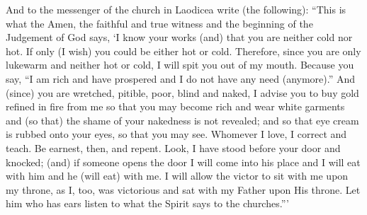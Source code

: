 \begin{pages}
\begin{Leftside}
		\pend
		\pstart
		And to the messenger of the church in Laodicea write (the following): “This is what the Amen, the faithful and true witness and the beginning of the Judgement of God says, ‘I know your works (and) that you are neither cold nor hot. If only (I wish) you could be either hot or cold. Therefore, since you are only lukewarm and neither hot or cold, I will spit you out of my mouth. Because you say, “I am rich and have prospered and I do not have any need (anymore).” And (since) you are wretched, pitible, poor, blind and naked, I advise you to buy gold refined in fire from me so that you may become rich and wear white garments and (so that) the shame of your nakedness is not revealed; and so that eye cream is rubbed onto your eyes, so that you may see. Whomever I love, I correct and teach. Be earnest, then, and repent. Look, I have stood before your door and knocked; (and) if someone opens the door I will come into his place and I will eat with him and he (will eat) with me. I will allow the victor to sit with me upon my throne, as I, too, was victorious and sat with my Father upon His throne. Let him who has ears listen to what the Spirit says to the churches.”’
		\pend
        \endnumbering
    \end{Leftside}

\end{pages} 
\Pages